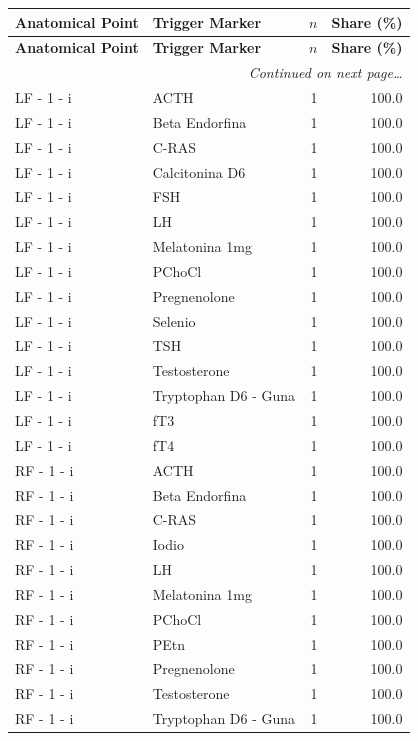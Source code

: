 \documentclass[a4paper,11pt]{article}
\begin{document}
\begin{footnotesize}
\begin{longtable}{p{3.5cm}p{7.5cm}rr}
\toprule
\textbf{Anatomical Point} &
\textbf{Trigger Marker} &
\textbf{$n$} &
\textbf{Share (\%)} \\
\midrule
\endfirsthead
\toprule
\textbf{Anatomical Point} &
\textbf{Trigger Marker} &
\textbf{$n$} &
\textbf{Share (\%)} \\
\midrule
\endhead
\midrule
\multicolumn{4}{r}{\footnotesize\emph{Continued on next page\ldots}} \\
\endfoot
\bottomrule
\endlastfoot
LF - 1 - i & ACTH & 1 & 100.0 \\
LF - 1 - i & Beta Endorfina & 1 & 100.0 \\
LF - 1 - i & C-RAS & 1 & 100.0 \\
LF - 1 - i & Calcitonina D6 & 1 & 100.0 \\
LF - 1 - i & FSH & 1 & 100.0 \\
LF - 1 - i & LH & 1 & 100.0 \\
LF - 1 - i & Melatonina 1mg & 1 & 100.0 \\
LF - 1 - i & PChoCl & 1 & 100.0 \\
LF - 1 - i & Pregnenolone & 1 & 100.0 \\
LF - 1 - i & Selenio & 1 & 100.0 \\
LF - 1 - i & TSH & 1 & 100.0 \\
LF - 1 - i & Testosterone & 1 & 100.0 \\
LF - 1 - i & Tryptophan D6 - Guna & 1 & 100.0 \\
LF - 1 - i & fT3 & 1 & 100.0 \\
LF - 1 - i & fT4 & 1 & 100.0 \\
RF - 1 - i & ACTH & 1 & 100.0 \\
RF - 1 - i & Beta Endorfina & 1 & 100.0 \\
RF - 1 - i & C-RAS & 1 & 100.0 \\
RF - 1 - i & Iodio & 1 & 100.0 \\
RF - 1 - i & LH & 1 & 100.0 \\
RF - 1 - i & Melatonina 1mg & 1 & 100.0 \\
RF - 1 - i & PChoCl & 1 & 100.0 \\
RF - 1 - i & PEtn & 1 & 100.0 \\
RF - 1 - i & Pregnenolone & 1 & 100.0 \\
RF - 1 - i & Testosterone & 1 & 100.0 \\
RF - 1 - i & Tryptophan D6 - Guna & 1 & 100.0 \\

\end{longtable}
\end{footnotesize}
\end{document}
